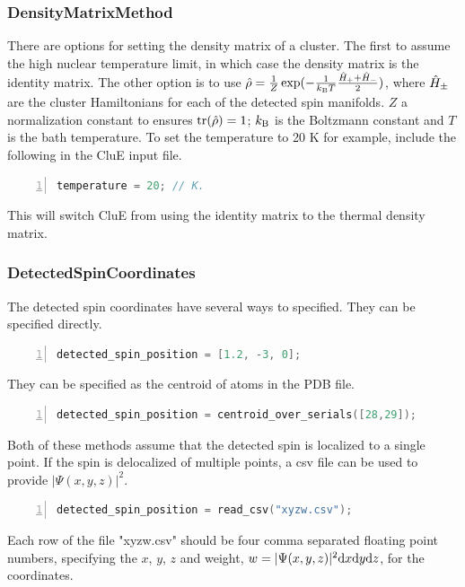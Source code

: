 \documentclass{book}
\begin{document}
\subsubsection{DensityMatrixMethod} %
There are options for setting the density matrix of a cluster.  
The first to assume the high nuclear temperature limit, in which case the 
density matrix is the identity matrix.  
The other option is to use 
$\hat{\rho} 
= \frac{1}{Z}\exp(-\frac{1}{k_\text{B} T}\frac{\hat{H}_{+} + \hat{H}_{-}}{2} )$,
where $\hat{H}_{\pm}$ are the cluster Hamiltonians for each of the detected spin
manifolds.  $Z$ a normalization constant to ensures $\text{tr}(\hat{\rho}) = 1$;
$k_\text{B}$ is the Boltzmann constant and $T$ is the bath temperature.
To set the temperature to 20 K for example, include the following in the
CluE input file.  
\begin{lstlisting}[frame=single,numbers=left,language=c]
temperature = 20; // K.
\end{lstlisting}
This will switch CluE from using the identity matrix to the thermal 
density matrix. 

\subsubsection{DetectedSpinCoordinates} %
The detected spin coordinates have several ways to specified.
They can be specified directly.
\begin{lstlisting}[frame=single,numbers=left,language=c]
detected_spin_position = [1.2, -3, 0];
\end{lstlisting}
They can be specified as the centroid of atoms in the PDB file.
\begin{lstlisting}[frame=single,numbers=left,language=c]
detected_spin_position = centroid_over_serials([28,29]);
\end{lstlisting}
Both of these methods assume that the detected spin is localized to a single
point.  If the spin is delocalized of multiple points, a csv file can be used
to provide $|\Psi(x,y,z)|^2$.  
\begin{lstlisting}[frame=single,numbers=left,language=c]
detected_spin_position = read_csv("xyzw.csv");
\end{lstlisting}
Each row of the file "xyzw.csv" should be four comma separated floating point
numbers, specifying the $x$, $y$, $z$ and weight,
$w = |\Psi(x,y,z)|^2 \text{d} x \text{d} y \text{d} z$, for the coordinates.
\end{document}
